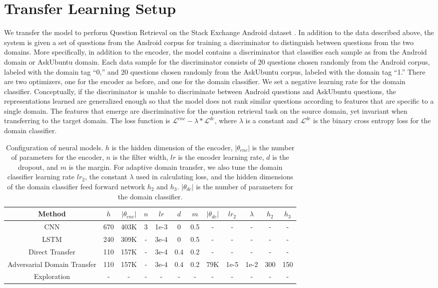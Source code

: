 \documentclass[11pt,a4paper]{article}
\begin{document}
\section{Transfer Learning Setup}
We transfer the model to perform Question Retrieval on the Stack Exchange Android dataset \cite{guo}. In addition to the data described above, the system is given a set of questions from the Android corpus for training a discriminator to distinguish between questions from the two domains. More specifically, in addition to the encoder, the model contains a discriminator that classifies each sample as from the Android domain or AskUbuntu domain. Each data sample for the discriminator consists of 20 questions chosen randomly from the Android corpus, labeled with the domain tag “0,” and 20 questions chosen randomly from the AskUbuntu corpus, labeled with the domain tag “1.” There are two optimizers, one for the encoder as before, and one for the domain classifier. We set a negative learning rate for the domain classifier. Conceptually, if the discriminator is unable to discriminate between Android questions and AskUbuntu questions, the representations learned are generalized enough so that the model does not rank similar questions according to features that are specific to a single domain. The features that emerge are discriminative for the question retrieval task on the source domain, yet invariant when transferring to the target domain. The loss function is $\mathcal{L}^{enc} - \lambda* \mathcal{L}^{dc}$, where $\lambda$ is a constant and  $\mathcal{L}^{dc}$ is the binary cross entropy loss for the domain classifier.

\begin{table*}[ht]
\centering
\begin{tabular}{c|ccccccccccc}
\hline
Method & $h$ & $|\theta_{enc}|$ & $n$ & $lr$ & $d$ & $m$ & $|\theta_{dc}|$ & $lr_2$ & $\lambda$ & $h_2$ & $h_3$ \\
\hline
CNN     & 670 & 403K & 3 & 1e-3 & 0 & 0.5 & - & - & - & - & -\\
LSTM    & 240 & 309K & - & 3e-4 & 0 & 0.5 & - & - & - & - & -\\
Direct Transfer & 110 & 157K & - & 3e-4 & 0.4 & 0.2 & - & - & - & - & -\\
Adversarial Domain Transfer & 110 & 157K & - & 3e-4 & 0.4 & 0.2 & 79K & 1e-5 & 1e-2 & 300 & 150\\
Exploration & - & - & - & - & - & - & - & - & - & - & -\\
\hline
\end{tabular}
\caption{Configuration of neural models. $h$ is the hidden dimension of the encoder, $|\theta_{enc}|$ is the number of parameters for the encoder, $n$ is the filter width, $lr$ is the encoder learning rate, $d$ is the dropout, and $m$ is the margin. For adaptive domain transfer, we also tune the domain classifier learning rate $lr_2$, the constant $\lambda$ used in calculating loss, and the hidden dimensions of the domain classifier feed forward network $h_2$ and $h_3$. $|\theta_{dc}|$ is the number of parameters for the domain classifier. }
\label{table1}
\end{table*}
\end{document}
